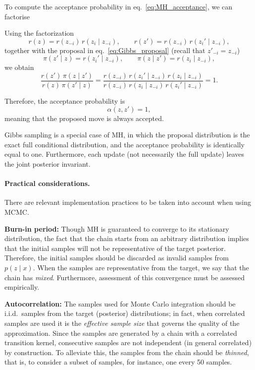 To compute the acceptance probability in eq.~\eqref{eq:MH_acceptance}, we can factorise

Using the factorization
\[
r(z) = r(z_{-i})\,r(z_i \mid z_{-i}),
\qquad
r(z') = r(z_{-i})\,r(z_i' \mid z_{-i}),
\]
together with the proposal in eq.~\eqref{eq:Gibbs_proposal} (recall that $z'_{-i} = z_{-i}$)
\[
\pi(z' \mid z) = r(z_i' \mid z_{-i}),
\qquad
\pi(z \mid z') = r(z_i \mid z_{-i}),
\]
we obtain
\[
\frac{r(z')\,\pi(z \mid z')}
     {r(z)\,\pi(z' \mid z)}
=
\frac{
r(z_{-i})\,r(z_i' \mid z_{-i})\,r(z_i \mid z_{-i})
}{
r(z_{-i})\,r(z_i \mid z_{-i})\,r(z_i' \mid z_{-i})
}
= 1.
\]

Therefore, the acceptance probability is
\[
\alpha(z,z') = 1,
\]
meaning that the proposed move is always accepted.


\begin{remark}
    Gibbs sampling is a special case of MH, in which the proposal distribution is the exact full conditional distribution, and the acceptance probability is identically equal to one. Furthermore, each update (not necessarily the full update) leaves the joint posterior invariant.
\end{remark}


\paragraph{Practical considerations.} There are relevant implementation practices to be taken into account when using MCMC. 

\textbf{Burn-in period:} Though MH is guaranteed to converge to its stationary distribution, the fact that the chain starts from an arbitrary distribution implies that the initial samples will not be representative of the target posterior. Therefore, the initial samples should be discarded as invalid samples from $p(z \mid x)$. When the samples are representative from the target, we say that the chain has \emph{mixed}. Furthermore, assessment of this convergence must be assessed empirically.  

\textbf{Autocorrelation:} The samples used for Monte Carlo integration should be i.i.d.~samples from the target (posterior) distributions; in fact, when correlated samples are used it is the \emph{effective sample size} that governs the quality of the approximation. Since the samples are generated by a chain with a correlated transition kernel, consecutive samples are not independent (in general correlated) by construction. To alleviate this, the samples from the chain should be \emph{thinned}, that is, to consider a subset of samples, for instance, one every 50 samples.

